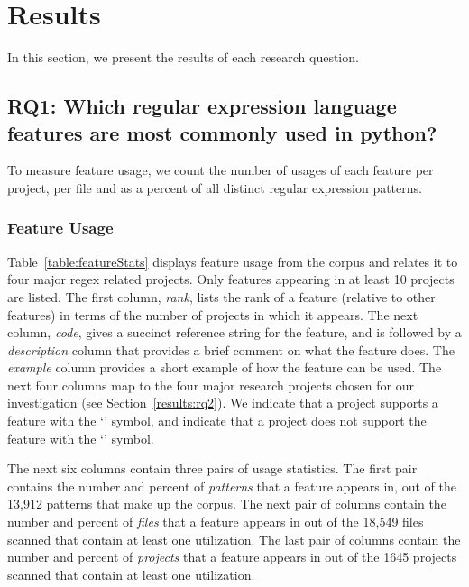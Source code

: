 \section{Results}
\label{sec:results}

In this section, we present the results of each research question.

\subsection{RQ1: Which regular expression language features are most commonly used in python?}
\label{results:re2}

To measure feature usage, we  count the number of usages of each feature per project, per file and as a percent of all distinct regular expression patterns.




\subsubsection{Feature Usage}
\label{sec:featureUsage}
Table~\ref{table:featureStats} displays feature usage from the corpus and relates it to four major regex related projects. Only features appearing in at least 10 projects are listed.
The first column, \emph{rank}, lists the rank of a feature (relative to other features) in terms of the number of projects in which it appears. The next column, \emph{code}, gives a succinct reference string for the feature, and is followed by a \emph{description} column that provides a brief comment on what the feature does.  The \emph{example} column provides a short example of how the feature can be used.
The next four columns map to the four major research projects chosen for our investigation (see Section~\ref{results:rq2}).  We indicate that a project supports a feature with the `\yes' symbol, and indicate that a project does not support the feature with the `\no' symbol.


The next six columns contain three pairs of usage statistics.  The first pair contains the number and percent of \emph{patterns} that a feature appears in, out of the 13,912 patterns that make up the corpus. The next pair of columns contain the number and percent of \emph{files} that a feature appears in out of the 18,549 files scanned that contain at least one utilization.  The last pair of columns contain the number and percent of \emph{projects} that a feature appears in out of the 1645 projects scanned that contain at least one utilization.

